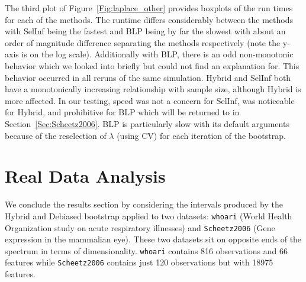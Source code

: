 The third plot of Figure~\ref{Fig:laplace_other} provides boxplots of the run times for each of the methods. The runtime differs considerably between the methods with SelInf being the fastest and BLP being by far the slowest with about an order of magnitude difference separating the methods respectively (note the y-axis is on the log scale). Additionally with BLP, there is an odd non-monotonic behavior which we looked into briefly but could not find an explanation for. This behavior occurred in all reruns of the same simulation. Hybrid and SelInf both have a monotonically increasing relationship with sample size, although Hybrid is more affected. In our testing, speed was not a concern for SelInf, was noticeable for Hybrid, and prohibitive for BLP which will be returned to in Section~\ref{Sec:Scheetz2006}. BLP is particularly slow with its default arguments because of the reselection of $\lambda$ (using CV) for each iteration of the bootstrap.



\section{Real Data Analysis}\label{Sec:RDA}

We conclude the results section by considering the intervals produced by the Hybrid and Debiased bootstrap applied to two datasets: \texttt{whoari} (World Health Organization study on acute respiratory illnesses) and \texttt{Scheetz2006} (Gene expression in the mammalian eye). These two datasets sit on opposite ends of the spectrum in terms of dimensionality. \texttt{whoari} contains 816 observations and 66 features while \texttt{Scheetz2006} contains just 120 observations but with 18975 features.

